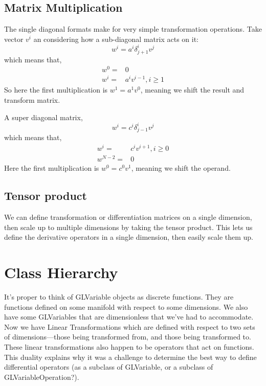 \documentclass[11pt]{article}
\begin{document}
\subsection{Matrix Multiplication}

The single diagonal formats make for very simple transformation operations. Take vector $v^i$ an considering how a sub-diagonal matrix acts on it:
\begin{equation}
w^i = a^i \delta^i_{j+1} v^j
\end{equation}
which means that,
\begin{align}
w^0 =& 0 \\
w^i = & a^i v^{i-1}, i \geqslant 1
\end{align}
So here the first multiplication is $w^1 = a^1 v^0$, meaning we shift the result and transform matrix.

A super diagonal matrix,
\begin{equation}
w^i = c^i \delta^i_{j-1} v^j
\end{equation}
which means that,
\begin{align}
w^i = & c^i v^{i+1}, i \geqslant 0\\
w^{N-2} =& 0
\end{align}
Here the first multiplication is $w^0 = c^0 v^1$, meaning we shift the operand.

\subsection{Tensor product}

We can define transformation or differentiation matrices on a single dimension, then scale up to multiple dimensions by taking the tensor product. This lets us define the derivative operators in a single dimension, then easily scale them up.

\section{Class Hierarchy}

It's proper to think of GLVariable objects as discrete functions. They are functions defined on some manifold with respect to some dimensions. We also have some GLVariables that are dimensionless that we've had to accommodate. Now we have Linear Transformations which are defined with respect to two sets of dimensions---those being transformed from, and those being transformed to. These linear transformations also happen to be operators that act on functions. This duality explains why it was a challenge to determine the best way to define differential operators (as a subclass of GLVariable, or a subclass of GLVariableOperation?).
\end{document}
